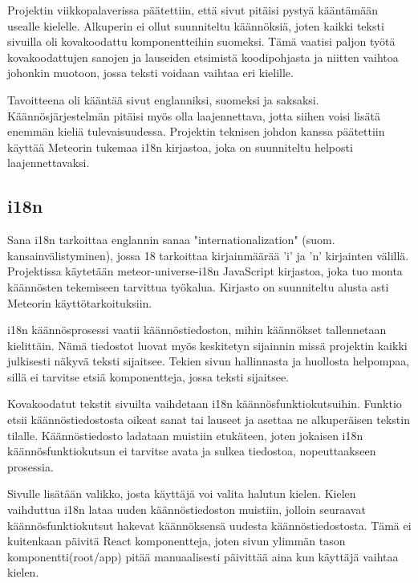 

Projektin viikkopalaverissa päätettiin, että sivut pitäisi pystyä kääntämään usealle kielelle.
Alkuperin ei ollut suunniteltu käännöksiä, joten kaikki teksti sivuilla oli kovakoodattu komponentteihin suomeksi. 
Tämä vaatisi paljon työtä kovakoodattujen sanojen ja lauseiden etsimistä koodipohjasta ja niitten vaihtoa johonkin muotoon, jossa teksti voidaan vaihtaa eri kielille.
\medskip

Tavoitteena oli kääntää sivut englanniksi, suomeksi ja saksaksi. Käännösjärjestelmän pitäisi myös olla laajennettava, jotta siihen voisi lisätä enemmän kieliä tulevaisuudessa.
Projektin teknisen johdon kanssa päätettiin käyttää Meteorin tukemaa i18n kirjastoa, joka on suunniteltu helposti laajennettavaksi.
\medskip







\subsection*{i18n}


Sana i18n tarkoittaa englannin sanaa "internationalization" (suom. kansainvälistyminen), jossa 18 tarkoittaa kirjainmäärää 'i' ja 'n' kirjainten välillä. Projektissa käytetään meteor-universe-i18n JavaScript kirjastoa, joka tuo monta käännösten tekemiseen tarvittua työkalua.
Kirjasto on suunniteltu alusta asti Meteorin käyttötarkoituksiin.\medskip

i18n käännösprosessi vaatii käännöstiedoston, mihin käännökset tallennetaan kielittäin.
Nämä tiedostot luovat myös keskitetyn sijainnin missä projektin kaikki julkisesti näkyvä teksti sijaitsee. Tekien sivun hallinnasta ja huollosta helpompaa, sillä ei tarvitse etsiä komponentteja, jossa teksti sijaitsee. 
\medskip

Kovakoodatut tekstit sivuilta vaihdetaan i18n käännösfunktiokutsuihin. Funktio etsii käännöstiedostosta oikeat sanat tai lauseet ja asettaa ne alkuperäisen tekstin tilalle. 
Käännöstiedosto ladataan muistiin etukäteen, joten jokaisen i18n käännösfunktiokutsun ei tarvitse avata ja sulkea tiedostoa, nopeuttaakseen prosessia.\medskip

Sivulle lisätään valikko, josta käyttäjä voi valita halutun kielen. Kielen vaihduttua i18n lataa uuden käännöstiedoston muistiin, jolloin seuraavat käännösfunktiokutsut hakevat käännöksensä uudesta käännöstiedostosta.
Tämä ei kuitenkaan päivitä React komponentteja, joten sivun ylimmän tason komponentti(root/app) pitää manuaalisesti päivittää aina kun käyttäjä vaihtaa kielen.\medskip




